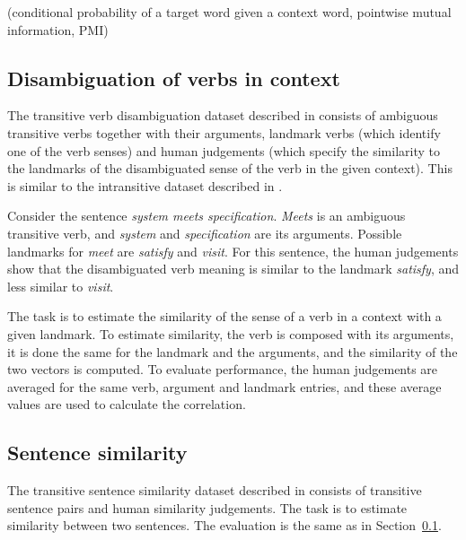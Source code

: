 (conditional probability of a target word given a context word, pointwise mutual information, PMI)



\subsection{Disambiguation of verbs in context}
\label{sec:disamb}

The transitive verb disambiguation dataset
described in  consists of ambiguous transitive verbs together with their arguments, landmark verbs (which identify one of the verb senses) and human judgements (which specify the similarity to the landmarks of the disambiguated sense of the verb in the given context). This is similar to the intransitive dataset described in .

Consider the sentence \textit{system meets specification}. \textit{Meets} is an ambiguous transitive verb, and \textit{system}
and \textit{specification} are its arguments. Possible landmarks for \emph{meet} are \textit{satisfy} and \textit{visit}. For this sentence, the human judgements show that the disambiguated verb meaning is similar to the landmark \textit{satisfy}, and less similar to \textit{visit}.

The task is to estimate the similarity of the sense of a verb in a context with a given landmark. To estimate similarity, the verb is composed with its arguments, it is done the same for the landmark and the arguments, and the similarity of the two vectors is computed. To evaluate performance, the human judgements are averaged for the same verb, argument and landmark entries, and these average values are used to calculate the correlation.

\subsection{Sentence similarity}
\label{sec:sentence-similarity}

The transitive sentence similarity dataset described in  consists of transitive sentence pairs and human similarity judgements. The task is to estimate similarity between two sentences. The evaluation is the same as in Section~\ref{sec:disamb}.

